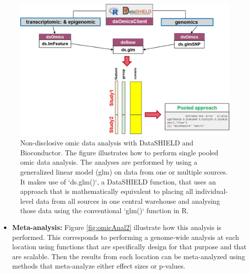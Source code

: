 \documentclass[
]{book}
\providecommand{\tightlist}{%
  \setlength{\itemsep}{0pt}\setlength{\parskip}{0pt}}
\begin{document}
\begin{figure}

{\centering \includegraphics[width=17.19in]{fig/dsOmics_B} 

}

\caption{Non-disclosive omic data analysis with DataSHIELD and Bioconductor. The figure illustrates how to perform single pooled omic data analysis. The analyses are performed by using a generalized linear model (glm) on data from one or multiple sources. It makes use of `ds.glm()`, a DataSHIELD function, that uses an approach that is mathematically equivalent to placing all individual-level data from all sources in one central warehouse and analysing those data using the conventional `glm()` function in R.}\label{fig:omicAnal1}
\end{figure}

\begin{itemize}
\tightlist
\item
  \textbf{Meta-analysis:} Figure \ref{fig:omicAnal2} illustrate how this analysis is performed. This corresponds to performing a genome-wide analysis at each location using functions that are specifically design for that purpose and that are scalable. Then the results from each location can be meta-analyzed using methods that meta-analyze either effect sizes or p-values.
\end{itemize}
\end{document}
